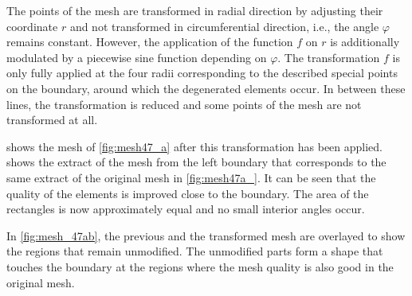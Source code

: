 The points of the mesh are transformed in radial direction by adjusting their coordinate $r$ and not transformed in circumferential direction, i.e., the angle $\varphi$ remains constant. However, the application of the function $f$ on $r$ is additionally modulated by a piecewise sine function depending on $\varphi$. The transformation $f$ is only fully applied at the four radii corresponding to the described special points on the boundary, around which the degenerated elements occur. In between these lines, the transformation is reduced and some points of the mesh are not transformed at all.

 shows the mesh of \cref{fig:mesh47_a} after this transformation has been applied.  shows the extract of the mesh from the left boundary that corresponds to the same extract of the original mesh in \cref{fig:mesh47a_}.
It can be seen that the quality of the elements is improved close to the boundary. The area of the rectangles is now approximately equal and no small interior angles occur.

In \cref{fig:mesh_47ab}, the previous and the transformed mesh are overlayed to show the regions that remain unmodified. The unmodified parts form a  shape that touches the boundary at the regions where the mesh quality is also good in the original mesh.

